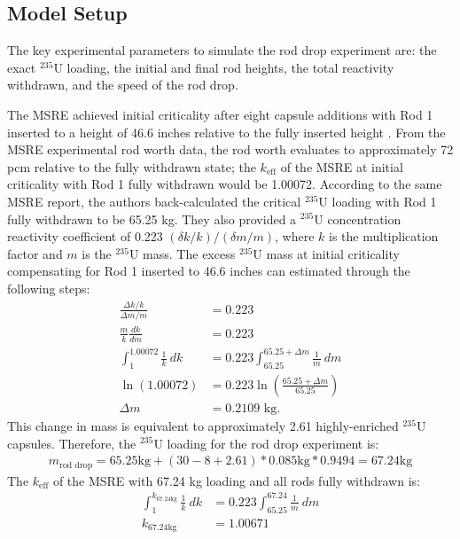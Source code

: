 \subsection{Model Setup} \label{sec:rod-drop-setup}

The key experimental parameters to simulate the rod drop experiment are: the exact $^{235}$U
loading, the initial and final rod heights, the total reactivity withdrawn, and the speed of the
rod drop.

The \gls{MSRE} achieved initial criticality after eight capsule additions with Rod 1 inserted to a
height of 46.6 inches relative to the fully inserted height \cite{prince_zero-power_1968}.
From the \gls{MSRE} experimental rod worth
data, the rod worth evaluates to approximately 72 pcm relative to the fully withdrawn state; the
$k_\text{eff}$ of the \gls{MSRE} at initial criticality with Rod 1 fully withdrawn would be
1.00072. According to the same \gls{MSRE} report, the
authors back-calculated the critical $^{235}$U loading with Rod 1 fully withdrawn to be 65.25 kg.
They also provided a $^{235}$U concentration reactivity coefficient of 0.223 $(\delta k/k)/(\delta m
/m)$, where $k$ is the multiplication factor and $m$ is the $^{235}$U mass. The excess $^{235}$U
mass at initial criticality compensating for Rod 1 inserted to 46.6
inches can estimated through the following steps:
%
\begin{align}
  \frac{\Delta k / k}{\Delta m / m} &= 0.223 \nonumber \\
  \frac{m}{k}\frac{dk}{dm} &= 0.223 \nonumber \\
  \int^{1.00072}_1 \frac{1}{k}\ dk &= 0.223 \int^{65.25+\Delta m}_{65.25} \frac{1}{m}\ dm \nonumber \\
  \ln \left(1.00072\right) &= 0.223 \ln\left(\frac{65.25+\Delta m}{65.25}\right) \nonumber \\
  \Delta m &= 0.2109 \mbox{ kg}.
\end{align}
%
This change in mass is equivalent to approximately 2.61 highly-enriched $^{235}$U capsules.
Therefore, the $^{235}$U loading for the rod drop experiment is:
%
\begin{gather}
  m_\text{rod drop} = 65.25 \text{kg} + (30 - 8 + 2.61) * 0.085 \text{kg} * 0.9494 = 67.24 \text{kg}
\end{gather}
%
The $k_\text{eff}$ of the \gls{MSRE} with 67.24 kg loading and all rods fully withdrawn is:
%
\begin{align}
  \int^{k_{67.24 \text{kg}}}_1 \frac{1}{k}\ dk &= 0.223 \int^{67.24}_{65.25} \frac{1}{m}\ dm \nonumber \\
    k_{67.24 \text{kg}} &= 1.00671
\end{align}


